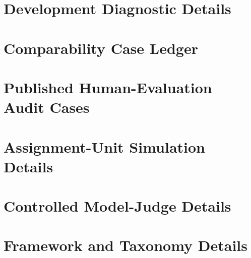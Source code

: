 \documentclass[11pt]{article}
\begin{document}
\clearpage


\clearpage
\appendix



\section{Development Diagnostic Details}








\FloatBarrier
\section{Comparability Case Ledger}
\label{sec:appendix-cases}


\FloatBarrier
\section{Published Human-Evaluation Audit Cases}



\FloatBarrier


\FloatBarrier
\section{Assignment-Unit Simulation Details}





\FloatBarrier
\section{Controlled Model-Judge Details}


\FloatBarrier
\section{Framework and Taxonomy Details}







\end{document}
